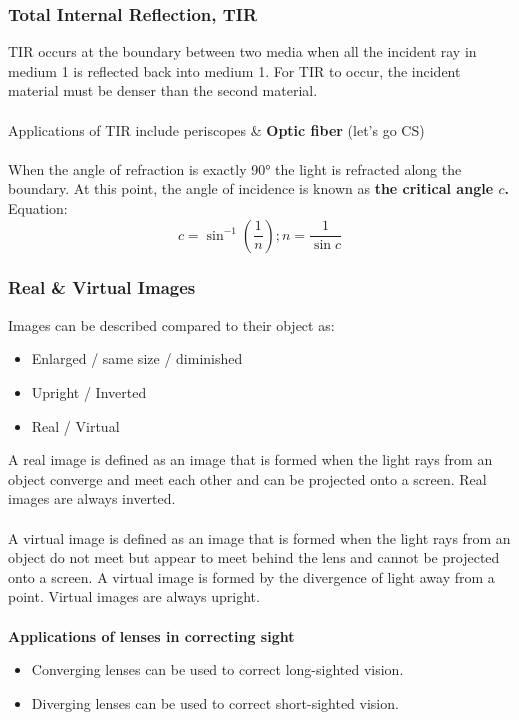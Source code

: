 \documentclass[a4paper,12pt]{article}
\begin{document}
\subsubsection{Total Internal Reflection, TIR}
TIR occurs at the boundary between two media when all the incident ray in medium 1 is reflected back into medium 1. For TIR to occur, the incident material must be denser than the second material. \\\\
Applications of TIR include periscopes \&  \textbf{Optic fiber} (let's go CS)\\\\
When the angle of refraction is exactly 90° the light is refracted along the boundary. At this point, the angle of incidence is known as\textbf{ the critical angle \(c\).} Equation:
\[c=\sin^{-1}(\frac{1}{n}); n=\frac{1}{\sin c}\]
\subsubsection{Real \& Virtual Images}
Images can be described compared to their object as:
\begin{itemize}
    \item Enlarged / same size / diminished
    \item Upright / Inverted
    \item Real / Virtual
\end{itemize}
A real image is defined as an image that is formed when the light rays from an object converge and meet each other and can be projected onto a screen. Real images are always inverted.\\\\
A virtual image is defined as an image that is formed when the light rays from an object do not meet but appear to meet behind the lens and cannot be projected onto a screen. A virtual image is formed by the divergence of light away from a point. Virtual images are always upright. \\\\
\textbf{Applications of lenses in correcting sight}
\begin{itemize}
    \item Converging lenses can be used to correct long-sighted vision.
    \item Diverging lenses can be used to correct short-sighted vision.
\end{itemize}
\end{document}
